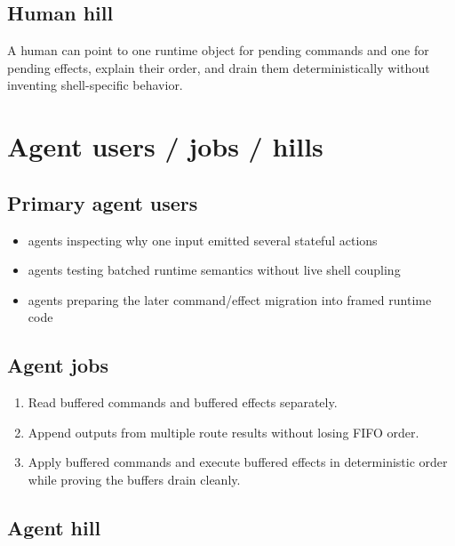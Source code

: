 \subsection{Human hill}\label{record-153-human-hill}

A human can point to one runtime object for pending commands and one for pending effects, explain their order, and drain them deterministically without inventing shell-specific behavior.

\section{Agent users / jobs / hills}\label{record-153-agent-users-jobs-hills}

\subsection{Primary agent users}\label{record-153-primary-agent-users}

\begin{itemize}
\tightlist
\item
  agents inspecting why one input emitted several stateful actions
\item
  agents testing batched runtime semantics without live shell coupling
\item
  agents preparing the later command/effect migration into framed runtime code
\end{itemize}

\subsection{Agent jobs}\label{record-153-agent-jobs}

\begin{enumerate}
\def\labelenumi{\arabic{enumi}.}
\tightlist
\item
  Read buffered commands and buffered effects separately.
\item
  Append outputs from multiple route results without losing FIFO order.
\item
  Apply buffered commands and execute buffered effects in deterministic order while proving the buffers drain cleanly.
\end{enumerate}

\subsection{Agent hill}\label{record-153-agent-hill}

